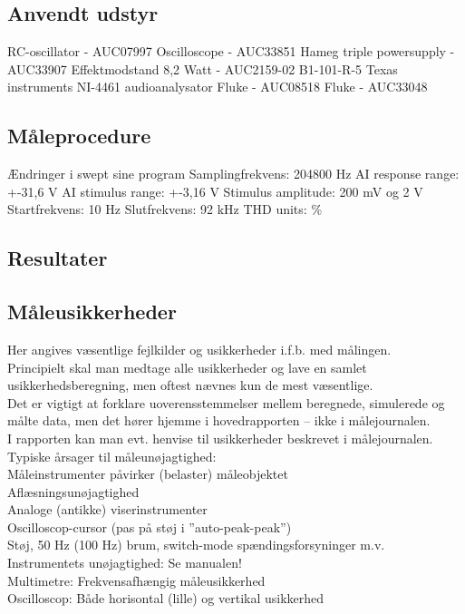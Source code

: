 \subsection*{Anvendt udstyr}
RC-oscillator - AUC07997
Oscilloscope - AUC33851
Hameg triple powersupply - AUC33907
Effektmodstand 8,2  Watt - AUC2159-02 B1-101-R-5
Texas instruments NI-4461 audioanalysator
Fluke - AUC08518
Fluke - AUC33048


\subsection*{Måleprocedure}



Ændringer i swept sine program
Samplingfrekvens: 204800 Hz
AI response range: +-31,6 V
AI stimulus range: +-3,16 V
Stimulus amplitude: 200 mV og 2 V
Startfrekvens: 10 Hz
Slutfrekvens: 92 kHz
THD units: \%

\subsection*{Resultater}



\subsection*{Måleusikkerheder}
Her angives væsentlige fejlkilder og usikkerheder i.f.b. med målingen. \\
Principielt skal man medtage alle usikkerheder og lave en samlet usikkerhedsberegning, men oftest nævnes kun de mest væsentlige. \\
Det er vigtigt at forklare uoverensstemmelser mellem beregnede, simulerede og målte data, men det hører hjemme i hovedrapporten – ikke i målejournalen. \\
I rapporten kan man evt. henvise til usikkerheder beskrevet i målejournalen.\\
Typiske årsager til måleunøjagtighed:\\
Måleinstrumenter påvirker (belaster) måleobjektet\\
Aflæsningsunøjagtighed\\
Analoge (antikke) viserinstrumenter	\\
Oscilloscop-cursor (pas på støj i ”auto-peak-peak”)\\
Støj, 50 Hz (100 Hz) brum, switch-mode spændingsforsyninger m.v.\\
Instrumentets unøjagtighed: Se manualen! \\
Multimetre: Frekvensafhængig måleusikkerhed \\
Oscilloscop: Både horisontal (lille) og vertikal usikkerhed\\
